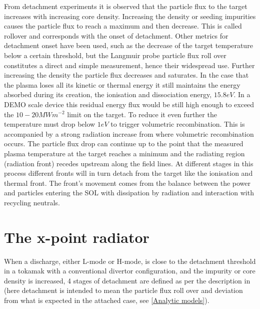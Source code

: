 From detachment experiments it is observed that the particle flux to the target increases with increasing core density. Increasing the density or seeding impurities causes the particle flux to reach a maximum and then decrease. This is called rollover and corresponds with the onset of detachment. Other metrics for detachment onset have been used, such as the decrease of the target temperature below a certain threshold\cite{Stangeby2000,Goldston2017}, but the Langmuir probe particle flux roll over constitutes a direct and simple measurement, hence their widespread use. Further increasing the density the particle flux decreases and saturates. In the case that the plasma loses all its kinetic or thermal energy it still maintains the energy absorbed during its creation, the ionisation and dissociation energy, $15.8eV$. In a DEMO scale device this residual energy flux would be still high enough to exceed the $10-20 MWm^{-2}$ limit on the target. \cite{Krasheninnikov2017a} To reduce it even further the temperature must drop below $1eV$ to trigger volumetric recombination. This is accompanied by a strong radiation increase from where volumetric recombination occurs. The particle flux drop can continue up to the point that the measured plasma temperature at the target reaches a minimum and the radiating region (radiation front) recedes upstream along the field lines.\cite{Krasheninnikov1999} At different stages in this process different fronts will in turn detach from the target like the ionisation and thermal front.\cite{Hutchinson1994,Loarte1998,Lipschultz2016} The front's movement comes from the balance between the power and particles entering the SOL with dissipation by radiation and interaction with recycling neutrals.




\section{The x-point radiator}\label{The x-point radiator}

When a discharge, either L-mode or H-mode, is close to the detachment threshold in a tokamak with a conventional divertor configuration, and the impurity or core density is increased, 4 stages of detachment are defined as per the description in \cite{Reimold2015,Potzel2014} (here detachment is intended to mean the particle flux roll over and deviation from what is expected in the attached case, see \autoref{Analytic models}).

